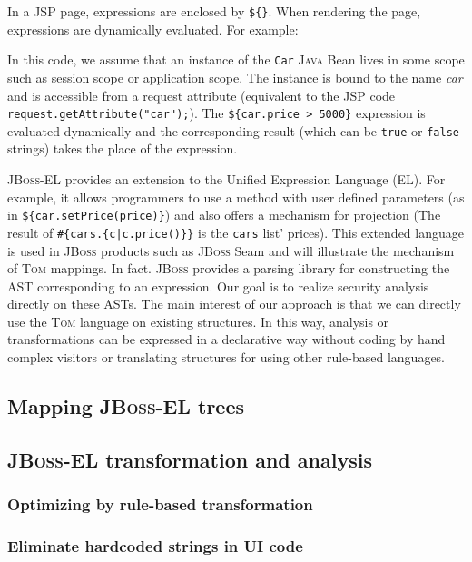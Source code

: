 \documentclass[runningheads]{llncs}
\newcommand{\jbossel}{\textsc{JBoss-EL}}
\newcommand{\jboss}{\textsc{JBoss}}
\newcommand{\jsp}{\textsc{JSP}}
\newcommand{\tom}{\textsc{Tom}}
\newcommand{\java}{\textsc{Java}}
\begin{document}
In a {\jsp} page, expressions are enclosed by \texttt{\$\{\}}. When rendering
the page, expressions are dynamically evaluated. For example:


In this code, we assume that an instance of the \verb+Car+ {\java} Bean lives
in some scope such as session scope or application scope.  The instance is
bound to the name \emph{car} and is accessible from a request attribute
(equivalent to the {\jsp} code \verb+request.getAttribute("car");+). The
\verb+${car.price > 5000}+ expression is evaluated dynamically and the
corresponding result (which can be \verb+true+ or \verb+false+ strings) takes
the place of the expression.

{\jbossel} provides an extension to the Unified Expression Language (EL). For
example, it allows programmers to use a method with user defined parameters (as
    in \verb+${car.setPrice(price)}+) and also offers a mechanism for
projection (The result of \verb+#{cars.{c|c.price()}}+ is the \verb+cars+ list'
    prices).  This extended language is used in {\jboss} products such as
{\jboss} Seam and will illustrate the mechanism of {\tom} mappings. In fact.
{\jboss} provides a parsing library for constructing the AST corresponding to
an expression. Our goal is to realize security analysis directly on these ASTs.
The main interest of our approach is that we can directly use the {\tom}
language on existing structures. In this way, analysis or transformations can
be expressed in a declarative way without coding by hand complex visitors or
translating structures for using other rule-based languages.

\subsection{Mapping {\jbossel} trees}


\subsection{{\jbossel} transformation and analysis}

\subsubsection{Optimizing by rule-based transformation}

\subsubsection{Eliminate hardcoded strings in UI code}
\end{document}
